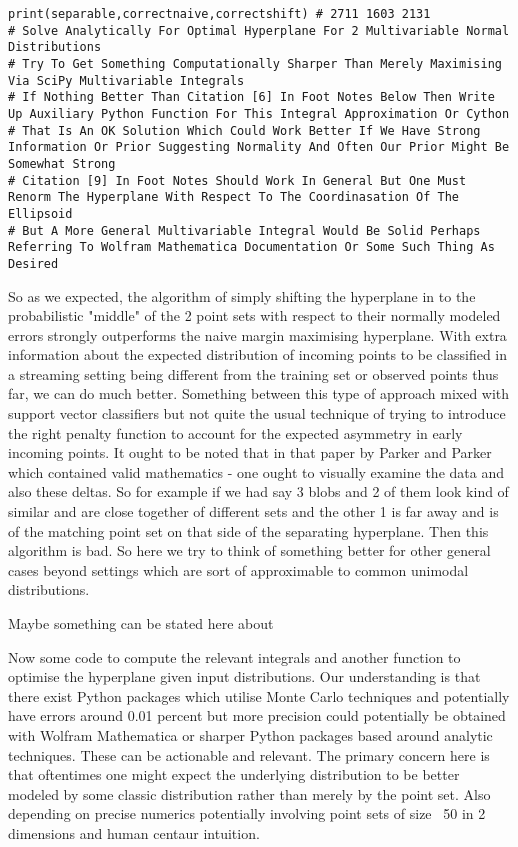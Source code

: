 \begin{verbatim}
print(separable,correctnaive,correctshift) # 2711 1603 2131
# Solve Analytically For Optimal Hyperplane For 2 Multivariable Normal Distributions
# Try To Get Something Computationally Sharper Than Merely Maximising Via SciPy Multivariable Integrals
# If Nothing Better Than Citation [6] In Foot Notes Below Then Write Up Auxiliary Python Function For This Integral Approximation Or Cython
# That Is An OK Solution Which Could Work Better If We Have Strong Information Or Prior Suggesting Normality And Often Our Prior Might Be Somewhat Strong
# Citation [9] In Foot Notes Should Work In General But One Must Renorm The Hyperplane With Respect To The Coordinasation Of The Ellipsoid
# But A More General Multivariable Integral Would Be Solid Perhaps Referring To Wolfram Mathematica Documentation Or Some Such Thing As Desired
\end{verbatim}

So as we expected, the algorithm of simply shifting the hyperplane in to the probabilistic "middle" of the 2 point sets with respect to their normally modeled errors strongly outperforms the naive margin maximising hyperplane. With extra information about the expected distribution of incoming points to be classified in a streaming setting being different from the training set or observed points thus far, we can do much better. Something between this type of approach mixed with support vector classifiers but not quite the usual technique of trying to introduce the right penalty function to account for the expected asymmetry in early incoming points. It ought to be noted that in that paper by Parker and Parker which contained valid mathematics - one ought to visually examine the data and also these deltas. So for example if we had say 3 blobs and 2 of them look kind of similar and are close together of different sets and the other 1 is far away and is of the matching point set on that side of the separating hyperplane. Then this algorithm is bad. So here we try to think of something better for other general cases beyond settings which are sort of approximable to common unimodal distributions.

Maybe something can be stated here about 

Now some code to compute the relevant integrals and another function to optimise the hyperplane given input distributions. Our understanding is that there exist Python packages which utilise Monte Carlo techniques and potentially have errors around 0.01 percent but more precision could potentially be obtained with Wolfram Mathematica or sharper Python packages based around analytic techniques. These can be actionable and relevant. The primary concern here is that oftentimes one might expect the underlying distribution to be better modeled by some classic distribution rather than merely by the point set. Also depending on precise numerics potentially involving point sets of size ~50 in 2 dimensions and human centaur intuition.

